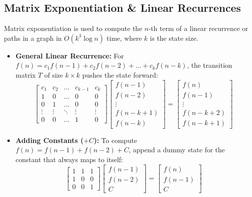 \subsection{Matrix Exponentiation \& Linear Recurrences}

Matrix exponentiation is used to compute the $n$-th term of a linear recurrence or paths in a graph in $O(k^3 \log n)$ time, where $k$ is the state size. 

\begin{itemize}
    \item \textbf{General Linear Recurrence:} 
    For $f(n) = c_1 f(n-1) + c_2 f(n-2) + \dots + c_k f(n-k)$, the transition matrix $T$ of size $k \times k$ pushes the state forward:
    \[
    \begin{bmatrix}
    c_1 & c_2 & \dots & c_{k-1} & c_k \\
    1 & 0 & \dots & 0 & 0 \\
    0 & 1 & \dots & 0 & 0 \\
    \vdots & \vdots & \ddots & \vdots & \vdots \\
    0 & 0 & \dots & 1 & 0
    \end{bmatrix}
    \begin{bmatrix}
    f(n-1) \\ f(n-2) \\ \vdots \\ f(n-k+1) \\ f(n-k)
    \end{bmatrix}
    =
    \begin{bmatrix}
    f(n) \\ f(n-1) \\ \vdots \\ f(n-k+2) \\ f(n-k+1)
    \end{bmatrix}
    \]

    \item \textbf{Adding Constants ($+C$):} 
    To compute $f(n) = f(n-1) + f(n-2) + C$, append a dummy state for the constant that always maps to itself:
    \[
    \begin{bmatrix}
    1 & 1 & 1 \\
    1 & 0 & 0 \\
    0 & 0 & 1 
    \end{bmatrix}
    \begin{bmatrix}
    f(n-1) \\ f(n-2) \\ C
    \end{bmatrix}
    =
    \begin{bmatrix}
    f(n) \\ f(n-1) \\ C
    \end{bmatrix}
    \]


\end{itemize}
